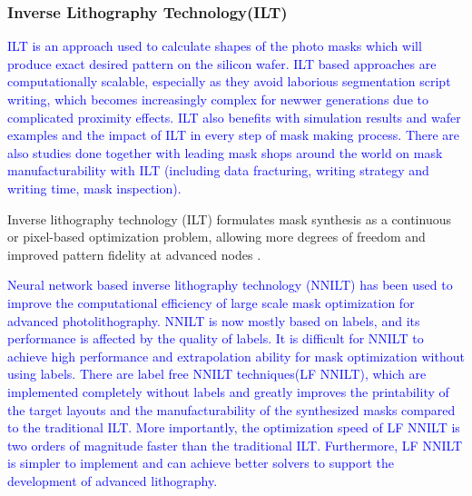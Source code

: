 \documentclass[pdflatex,sn-mathphys-num]{sn-jnl}%
\theoremstyle{thmstyleone}%
\theoremstyle{thmstyletwo}%
\theoremstyle{thmstylethree}%
\begin{document}
\subsubsection{Inverse Lithography Technology(ILT)}

\textcolor{blue}{ ILT is an approach used to calculate shapes of the photo masks which will produce exact desired pattern on the silicon wafer. ILT based approaches are computationally scalable, especially as they avoid laborious segmentation script writing, which becomes increasingly complex for newwer generations due to complicated proximity effects. ILT also benefits with simulation results and wafer examples and the impact of ILT in every step of mask making process. There are also studies done together with leading mask shops around the world on mask manufacturability with ILT (including data fracturing, writing strategy and writing time, mask inspection). \cite{pang2006inverse}}

Inverse lithography technology (ILT) formulates mask synthesis as a continuous or pixel-based optimization problem, allowing more degrees of freedom and improved pattern fidelity at advanced nodes \cite{cecil2022advances}. 

\textcolor{blue}{ Neural network based inverse lithography technology (NNILT) has been used to improve the computational efficiency of large scale mask optimization for advanced photolithography. NNILT is now mostly based on labels, and its performance is affected by the quality of labels. It is difficult for NNILT to achieve high performance and extrapolation ability for mask optimization without using labels. There are label free NNILT techniques(LF NNILT), which are implemented completely without labels and greatly improves the printability of the target layouts and the manufacturability of the synthesized masks compared to the traditional ILT. More importantly, the optimization speed of LF NNILT is two orders of magnitude faster than the traditional ILT. Furthermore, LF NNILT is simpler to implement and can achieve better solvers to support the development of advanced lithography.\cite{chen2022label}}
\end{document}
